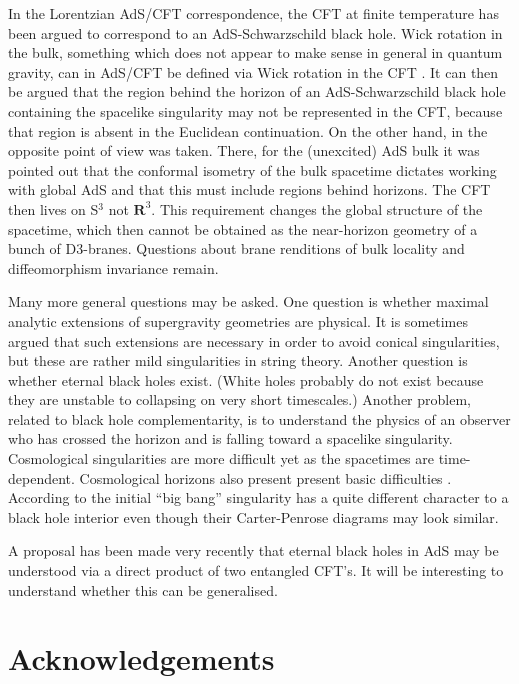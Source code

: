 \documentclass[a4paper,12pt]{amsproc}
\numberwithin{equation}{section}
\def\bR{\mathbf{R}}
\begin{document}
In the Lorentzian AdS/CFT correspondence, the CFT at finite
temperature has been argued to correspond to an AdS-Schwarzschild
black hole.  Wick rotation in the bulk, something which does not
appear to make sense in general in quantum gravity, can in AdS/CFT be
defined via Wick rotation in the CFT \cite{bkl}.  It can then be
argued that the region behind the horizon of an AdS-Schwarzschild
black hole containing the spacelike singularity may not be represented
in the CFT, because that region is absent in the Euclidean
continuation.  On the other hand, in \cite{horoog} the opposite point
of view was taken.  There, for the (unexcited) AdS bulk it was pointed
out that the conformal isometry of the bulk spacetime dictates working
with global AdS and that this must include regions behind horizons.
The CFT then lives on S$^3$ not $\bR^3$.  This requirement changes the
global structure of the spacetime, which then cannot be obtained as
the near-horizon geometry of a bunch of D3-branes. Questions about
brane renditions of bulk locality and diffeomorphism invariance
remain.

Many more general questions may be asked.  One question is whether
maximal analytic extensions of supergravity geometries are physical.
It is sometimes argued that such extensions are necessary in order to
avoid conical singularities, but these are rather mild singularities
in string theory.  Another question is whether eternal black holes
exist.  (White holes probably do not exist because they are unstable
to collapsing on very short timescales.)  Another problem, related to
black hole complementarity, is to understand the physics of an
observer who has crossed the horizon and is falling toward a spacelike
singularity.  Cosmological singularities are more difficult yet as the
spacetimes are time-dependent.  Cosmological horizons also present
present basic difficulties \cite{raph,willy,lenny}.  According to
\cite{tomb} the initial ``big bang'' singularity has a quite different
character to a black hole interior even though their Carter-Penrose
diagrams may look similar.

A proposal has been made very recently \cite{juanavatar} that eternal
black holes in AdS may be understood via a direct product of two
entangled CFT's.  It will be interesting to understand whether this
can be generalised.

\section*{Acknowledgements}
\end{document}
